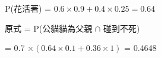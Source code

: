 \documentclass{article}
\begin{document}
\fontsize{15pt}{20pt}\selectfont

\begin{CJK}{UTF8}{bsmi} %
\noindent
P(花活著) = $0.6 \times 0.9 + 0.4 \times 0.25 = 0.64$ 

原式 = P(公貓貓為父親 $\cap$ 碰到不死)

= 0.7 $\times (0.64 \times 0.1 + 0.36 \times 1)$ = 0.4648

\end{CJK} %
\end{document}
